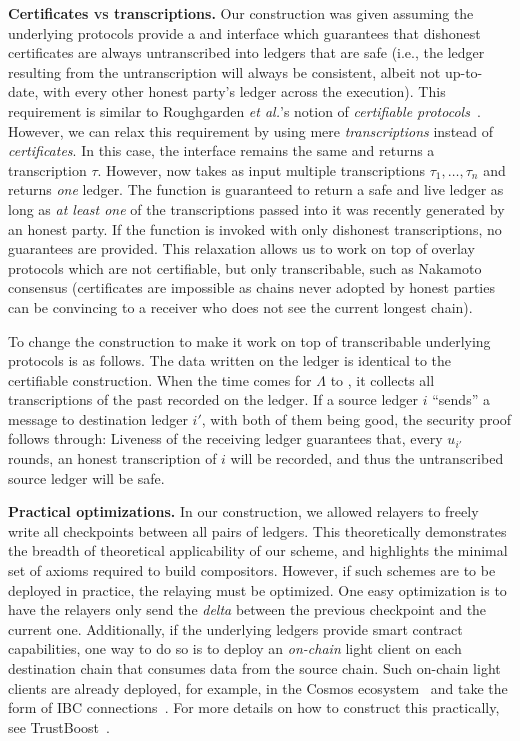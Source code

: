 \noindent
\textbf{Certificates \textsc{vs} transcriptions.}
Our \rollerblade construction was given assuming the underlying protocols
provide a \transcribe and \untranscribe interface which guarantees that
dishonest certificates are always untranscribed into ledgers that are
safe (i.e., the ledger resulting from the untranscription will always
be consistent, albeit not up-to-date, with every other honest party's
ledger across the execution). This requirement is similar to Roughgarden
\emph{et al.}'s notion of \emph{certifiable protocols}~\cite{certifiable-roughgarden}.
However, we can relax this requirement by using mere \emph{transcriptions}
instead of \emph{certificates}. In this case, the \transcribe interface
remains the same and returns a transcription $\tau$. However, \untranscribe
now takes as input multiple transcriptions $\tau_1, \ldots, \tau_n$ and
returns \emph{one} ledger. The \untranscribe function is guaranteed to return
a safe and live ledger as long as \emph{at least one} of the transcriptions
passed into it was recently generated by an honest party. If the \untranscribe
function is invoked with only dishonest transcriptions, no guarantees are
provided. This relaxation allows us to work on top of overlay protocols
which are not certifiable, but only transcribable, such as Nakamoto consensus
(certificates are impossible as chains never adopted by honest parties
can be convincing to a receiver who does not see the current longest chain).

To change the \rollerblade construction to make it work on top of transcribable
underlying protocols is as follows. The data written on the ledger is identical to the
certifiable \rollerblade construction. When the time comes for $\Lambda$ to
\untranscribe, it collects all transcriptions of the past recorded on the ledger.
If a source ledger $i$ ``sends'' a message to destination ledger $i'$, with both
of them being good, the security proof follows through:
Liveness of the receiving ledger guarantees that, every $u_{i'}$ rounds, an honest
transcription of $i$ will be recorded, and thus the untranscribed source ledger
will be safe.

\noindent
\textbf{Practical optimizations.}
In our \rollerblade construction, we allowed relayers to freely write all
checkpoints between all pairs of ledgers. This theoretically demonstrates
the breadth of theoretical applicability of our scheme, and highlights
the minimal set of axioms required to build compositors.
However, if such schemes are to be deployed in practice, the relaying
must be optimized. One easy optimization is to have the relayers only
send the \emph{delta} between the previous checkpoint and the current one.
Additionally, if the underlying ledgers provide smart contract
capabilities, one way to do so is to deploy an \emph{on-chain} light
client on each destination chain that consumes data from the source
chain. Such on-chain light clients are already deployed, for example,
in the Cosmos ecosystem~\cite{cosmos} and take the form of IBC
connections~\cite{ibc}. For more details on how to construct this
practically, see TrustBoost~\cite{trustboost}.